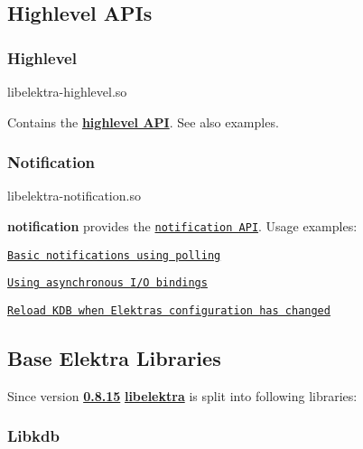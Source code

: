 \subsection*{Highlevel A\+P\+Is}

\subsubsection*{Highlevel}

\begin{DoxyVerb}libelektra-highlevel.so
\end{DoxyVerb}


Contains the {\bfseries \hyperlink{src_libs_highlevel_README_md}{highlevel A\+PI}}. See also examples.

\subsubsection*{Notification}

\begin{DoxyVerb}libelektra-notification.so
\end{DoxyVerb}


{\bfseries notification} provides the \href{https://doc.libelektra.org/api/current/html/group__kdbnotification.html}{\tt notification A\+PI}. Usage examples\+:


\begin{DoxyItemize}
\item \href{https://www.libelektra.org/examples/notificationpolling}{\tt Basic notifications using polling}
\item \href{https://www.libelektra.org/examples/notificationasync}{\tt Using asynchronous I/O bindings}
\item \href{https://www.libelektra.org/examples/notificationreload}{\tt Reload K\+DB when Elektra\textquotesingle{}s configuration has changed}
\end{DoxyItemize}

\subsection*{Base Elektra Libraries}

Since version {\bfseries \hyperlink{doc_decisions_library_split_md}{0.8.15}} {\bfseries \hyperlink{md_src_libs_elektra_README_src_libs_elektra_README_md}{libelektra}} is split into following libraries\+:

 \subsubsection*{Libkdb}

